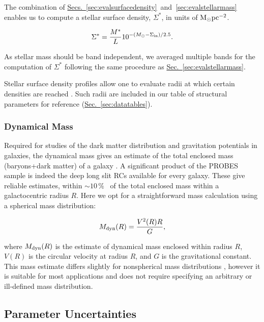 \documentclass[twocolumn]{aastex631}
\newcommand{\Sec}[1]{{\protect\hyperref[sec:#1]{Sec.~\ref*{sec:#1}}}}
\newcommand{\Secs}[2]{{\protect\hyperref[sec:#1]{Secs.~\ref*{sec:#1}}~and~\ref{sec:#2}}}
\newcommand{\wunits}[2]{\ensuremath{#1\,\text{#2}}}
\begin{document}
The combination of \Secs{evalsurfacedensity}{evalstellarmass} enables us to compute a stellar surface density, $\Sigma^*$, in units of ${\rm M}_{\odot}{\rm pc}^{-2}$. 

\begin{equation}
    \Sigma^* = \frac{M^*}{L}10^{-(M_{\odot} - \Sigma_{\rm in})/2.5} .
\end{equation}

As stellar mass should be band independent, we averaged multiple bands for the computation of $\Sigma^*$ following the same procedure as \Sec{evalstellarmass}.

Stellar surface density profiles allow one to evaluate radii at which certain densities are reached \citep[e.g.][]{Trujillo2020}.
Such radii are included in our table of structural parameters for reference (\Sec{datatables}). 

\subsubsection{Dynamical Mass}\label{sec:evaldynamicalmass}

Required for studies of the dark matter distribution and gravitation potentials in galaxies, the dynamical mass gives an estimate of the total enclosed mass (baryons+dark matter) of a galaxy \citep{Courteau2014}. 
A significant product of the PROBES sample is indeed the deep long slit RCs available for every galaxy.
These give reliable estimates, within $\sim$\wunits{10}{\%}~\citep[Sec.~2.6, Fig.~2.17]{Binney2008} of the total enclosed mass within a galactocentric radius $R$. 
Here we opt for a straightforward mass calculation using a spherical mass distribution:

\begin{equation}
    M_{\rm dyn}(R) = \frac{V^2(R)R}{G},
\end{equation}

where $M_{\rm dyn}(R)$ is the estimate of dynamical mass enclosed within radius $R$, $V(R)$ is the circular velocity at radius $R$, and $G$ is the gravitational constant.
This mass estimate differs slightly for nonspherical mass distributions \citep{Binney2008}, however it is suitable for most applications and does not require specifying an arbitrary or ill-defined mass distribution.

\subsection{Parameter Uncertainties}\label{sec:uncertainties}
\end{document}
